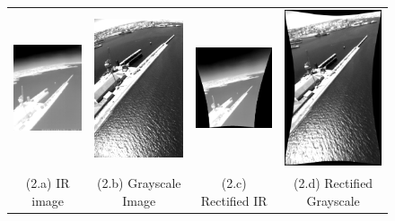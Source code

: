 \documentclass[runningheads]{llncs}
\begin{document}
\begin{figure}
  \begin{tabular}{cccc}
    \includegraphics[width=3cm]{img/eps/fusion/Sea/3/Infrared_Image_screenshot.eps} &
    \includegraphics[width=3cm]{img/eps/fusion/Sea/3/Grayscale_Image_screenshot.eps} &
    \includegraphics[width=3cm]{img/eps/fusion/Sea/3/Warped_Infrared_Image_screenshot.eps} &
    \includegraphics[width=3cm]{img/eps/fusion/Sea/3/Warped_Grayscale_Image_screenshot.eps} \\
    \small (2.a) IR image & 
    \small (2.b) Grayscale Image &
    \small (2.c) Rectified IR &
    \small (2.d) Rectified Grayscale
  \end{tabular}
  
  \vspace{\floatsep}
  

\end{figure}
\end{document}
